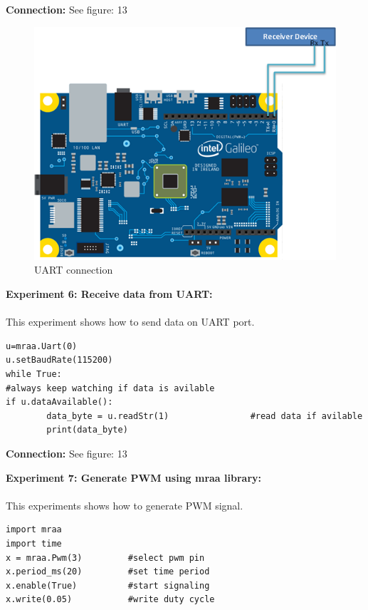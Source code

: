\documentclass[11pt,a4paper]{article}
\begin{document}
\textbf{Connection:}
See figure: 13
\begin{figure}
	\includegraphics[width=\linewidth]{12.png}
    \caption{UART connection}
    \end{figure}
   \newpage
       \textbf{\Large{Experiment 6: Receive data from UART:}}\\
    \vspace{.1cm}\\
   This experiment shows how to send data on UART port.
\begin{lstlisting}
u=mraa.Uart(0)
u.setBaudRate(115200)
while True:															#always keep watching if data is avilable
if u.dataAvailable():
		data_byte = u.readStr(1)				#read data if avilable
		print(data_byte)

\end{lstlisting}

\textbf{Connection:}
See figure: 13\\
\vspace{1cm}

        \textbf{\Large{Experiment 7: Generate PWM using mraa library:}}\\
    \vspace{.1cm}\\
   This experiments shows how to generate PWM signal.
\begin{lstlisting}
import mraa
import time
x = mraa.Pwm(3)			#select pwm pin
x.period_ms(20)			#set time period
x.enable(True)			#start signaling
x.write(0.05)			#write duty cycle
\end{lstlisting}
\end{document}
